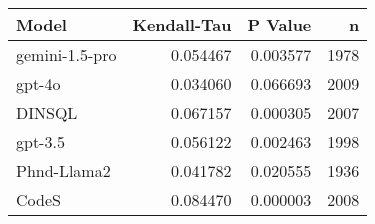 \begin{tabular}{lrrr}
\toprule
Model & Kendall-Tau & P Value & n \\
\midrule
gemini-1.5-pro & 0.054467 & 0.003577 & 1978 \\
gpt-4o & 0.034060 & 0.066693 & 2009 \\
DINSQL & 0.067157 & 0.000305 & 2007 \\
gpt-3.5 & 0.056122 & 0.002463 & 1998 \\
Phnd-Llama2 & 0.041782 & 0.020555 & 1936 \\
CodeS & 0.084470 & 0.000003 & 2008 \\
\bottomrule
\end{tabular}
